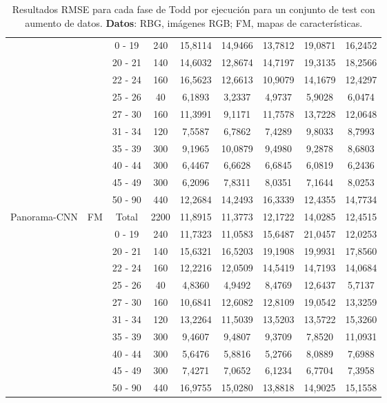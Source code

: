 \begin{table}[ht!]
{\begin{tabular}{|c|c|c|c|c|c|c|c|c|}
 &  & 0 - 19 & 240 & 15,8114 & 14,9466 & 13,7812 & 19,0871 & 16,2452 \\
 &  & 20 - 21 & 140 & 14,6032 & 12,8674 & 14,7197 & 19,3135 & 18,2566 \\
 &  & 22 - 24 & 160 & 16,5623 & 12,6613 & 10,9079 & 14,1679 & 12,4297 \\
 &  & 25 - 26 & 40 & 6,1893 & 3,2337 & 4,9737 & 5,9028 & 6,0474 \\
 &  & 27 - 30 & 160 & 11,3991 & 9,1171 & 11,7578 & 13,7228 & 12,0648 \\
 &  & 31 - 34 & 120 & 7,5587 & 6,7862 & 7,4289 & 9,8033 & 8,7993 \\
 &  & 35 - 39 & 300 & 9,1965 & 10,0879 & 9,4980 & 9,2878 & 8,6803 \\
 &  & 40 - 44 & 300 & 6,4467 & 6,6628 & 6,6845 & 6,0819 & 6,2436 \\
 &  & 45 - 49 & 300 & 6,2096 & 7,8311 & 8,0351 & 7,1644 & 8,0253 \\
 &  & 50 - 90 & 440 & 12,2684 & 14,2493 & 16,3339 & 12,4355 & 14,7734 \\ \hline
\multirow{11}{*}{Panorama-CNN} & \multirow{11}{*}{FM} & Total & 2200 & 11,8915 & 11,3773 & 12,1722 & 14,0285 & 12,4515 \\
 &  & 0 - 19 & 240 & 11,7323 & 11,0583 & 15,6487 & 21,0457 & 12,0253 \\
 &  & 20 - 21 & 140 & 15,6321 & 16,5203 & 19,1908 & 19,9931 & 17,8560 \\
 &  & 22 - 24 & 160 & 12,2216 & 12,0509 & 14,5419 & 14,7193 & 14,0684 \\
 &  & 25 - 26 & 40 & 4,8360 & 4,9492 & 8,4769 & 12,6437 & 5,7137 \\
 &  & 27 - 30 & 160 & 10,6841 & 12,6082 & 12,8109 & 19,0542 & 13,3259 \\
 &  & 31 - 34 & 120 & 13,2264 & 11,5039 & 13,5203 & 13,5722 & 15,3260 \\
 &  & 35 - 39 & 300 & 9,4607 & 9,4807 & 9,3709 & 7,8520 & 11,0931 \\
 &  & 40 - 44 & 300 & 5,6476 & 5,8816 & 5,2766 & 8,0889 & 7,6988 \\
 &  & 45 - 49 & 300 & 7,4271 & 7,0652 & 6,1234 & 6,7704 & 7,3958 \\
 &  & 50 - 90 & 440 & 16,9755 & 15,0280 & 13,8818 & 14,9025 & 15,1558 \\ \hline
\end{tabular}%
}
\caption[Resultados RMSE para cada fase de Todd por ejecución para un conjunto de test con aumento de datos.]{Resultados RMSE para cada fase de Todd por ejecución para un conjunto de test con aumento de datos. \textbf{Datos}: RBG, imágenes RGB; FM, mapas de características.}
\label{tab:rtodd_c_rmse}
\end{table}
